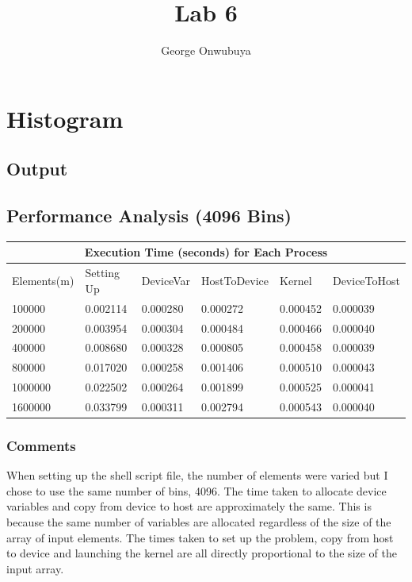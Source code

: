 \documentclass{article}
\title{Lab 6}
\author{George Onwubuya}
\begin{document}
\maketitle

\section{Histogram}
\subsection{Output}

\subsection{Performance Analysis (4096 Bins)} 
 \setlength{\parindent}{1cm}
 \begin{tabular}{ |p{2.5cm}||p{2cm}|p{2cm}|p{2cm}|p{2cm}|p{2cm}|  }
 \hline
 \multicolumn{6}{|c|}{Execution Time (seconds) for Each Process } \\
 \hline
Elements(m) & Setting Up & DeviceVar & HostToDevice & Kernel & DeviceToHost\\
 \hline
 100000 & 0.002114 & 0.000280 & 0.000272 & 0.000452 & 0.000039\\
 \hline
 200000 & 0.003954 & 0.000304 & 0.000484 & 0.000466 & 0.000040\\
 \hline
 400000 & 0.008680 & 0.000328 & 0.000805 & 0.000458 & 0.000039\\
 \hline
 800000 & 0.017020 & 0.000258 & 0.001406 & 0.000510 & 0.000043\\
 \hline
 1000000 & 0.022502 & 0.000264 & 0.001899 & 0.000525 & 0.000041\\
 \hline
 1600000 & 0.033799 & 0.000311 & 0.002794 & 0.000543 & 0.000040\\
 \hline
 \end{tabular}
 
\subsubsection{Comments} 
 When setting up the shell script file, the number of elements were varied but I chose to use the same number of bins, 4096. The time taken to allocate device variables and copy from device to host are approximately the same. This is because the same number of variables are allocated regardless of the size of the array of input elements. The times taken to set up the problem, copy from host to device and launching the kernel are all directly proportional to the size of the input array.   
\end{document}

